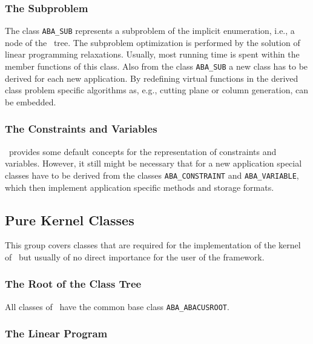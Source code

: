 \subsubsection{The Subproblem}

The class {\tt ABA\_SUB} represents a subproblem of the implicit
enumeration, i.e., a node of the \bab\ tree. The subproblem optimization
is performed by the solution of linear programming relaxations. Usually,
most running time is spent within the member functions of this class.
Also from the class {\tt ABA\_SUB} a new class has to be derived for each new
application. By redefining virtual functions in the derived class
problem specific algorithms as, e.g., cutting plane or column generation,
can be embedded.

\subsubsection{The Constraints and Variables}

\ABACUS\ provides some default concepts for the representation of constraints
and variables. However, it still might be necessary that for a new
application special classes have to be derived from the classes
{\tt ABA\_CONSTRAINT} and 
{\tt ABA\_VARIABLE}, 
which then implement application specific
methods and storage formats.

\subsection{Pure Kernel Classes}

This group covers classes that are required for the implementation
of the kernel of \ABACUS\ but usually of no direct importance for the
user of the framework.

\subsubsection{The Root of the Class Tree}

All classes of \ABACUS\ have the common base class
{\tt ABA\_ABACUSROOT}.

\subsubsection{The Linear Program}


